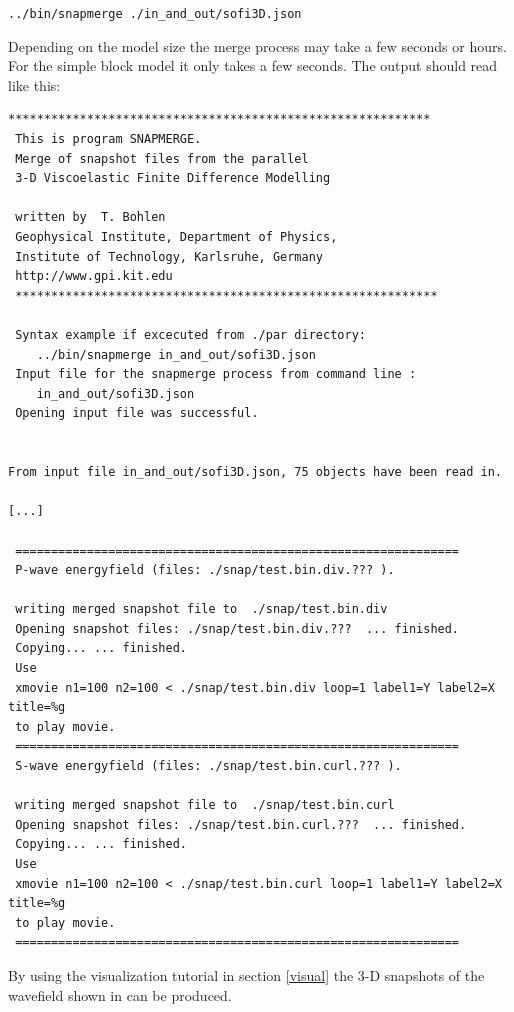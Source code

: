 \documentclass[11pt,onecolumn,oneside]{article}
\begin{document}
 \lstinline{../bin/snapmerge ./in_and_out/sofi3D.json}

Depending on the model size the merge process may take a few seconds or hours. For the simple block model it only takes a few seconds. The output should read like this:

\begin{verbatim}
***********************************************************
 This is program SNAPMERGE.
 Merge of snapshot files from the parallel
 3-D Viscoelastic Finite Difference Modelling

 written by  T. Bohlen
 Geophysical Institute, Department of Physics,
 Institute of Technology, Karlsruhe, Germany
 http://www.gpi.kit.edu
 ***********************************************************

 Syntax example if excecuted from ./par directory: 
    ../bin/snapmerge in_and_out/sofi3D.json
 Input file for the snapmerge process from command line : 
    in_and_out/sofi3D.json
 Opening input file was successful.


From input file in_and_out/sofi3D.json, 75 objects have been read in.

[...]

 ==============================================================
 P-wave energyfield (files: ./snap/test.bin.div.??? ).

 writing merged snapshot file to  ./snap/test.bin.div
 Opening snapshot files: ./snap/test.bin.div.???  ... finished.
 Copying... ... finished.
 Use
 xmovie n1=100 n2=100 < ./snap/test.bin.div loop=1 label1=Y label2=X title=%g
 to play movie.
 ==============================================================
 S-wave energyfield (files: ./snap/test.bin.curl.??? ).

 writing merged snapshot file to  ./snap/test.bin.curl
 Opening snapshot files: ./snap/test.bin.curl.???  ... finished.
 Copying... ... finished.
 Use
 xmovie n1=100 n2=100 < ./snap/test.bin.curl loop=1 label1=Y label2=X title=%g
 to play movie.
 ==============================================================
\end{verbatim} 

By using the visualization tutorial in section \ref{visual} the 3-D snapshots of the wavefield shown in  can be produced.
\newpage
\end{document}
